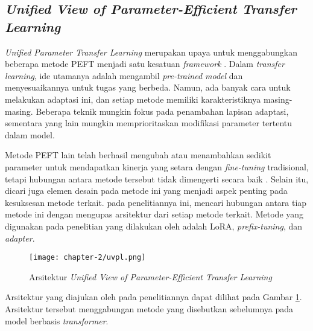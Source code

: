 \subsection{\textit{Unified View of Parameter-Efficient Transfer Learning}}

\textit{Unified Parameter Transfer Learning} merupakan upaya untuk menggabungkan beberapa metode PEFT menjadi satu kesatuan \textit{framework} \parencite{uvpl}. Dalam \textit{transfer learning}, ide utamanya adalah mengambil \textit{pre-trained model} dan menyesuaikannya untuk tugas yang berbeda. Namun, ada banyak cara untuk melakukan adaptasi ini, dan setiap metode memiliki karakteristiknya masing-masing. Beberapa teknik mungkin fokus pada penambahan lapisan adaptasi, sementara yang lain mungkin memprioritaskan modifikasi parameter tertentu dalam model.

Metode PEFT lain telah berhasil mengubah atau menambahkan sedikit parameter untuk mendapatkan kinerja yang setara dengan \textit{fine-tuning} tradisional, tetapi hubungan antara metode tersebut tidak dimengerti secara baik \parencite{uvpl}. Selain itu, dicari juga elemen desain pada metode ini yang menjadi aspek penting pada kesuksesan metode terkait. \citeauthor{uvpl} pada penelitiannya ini, mencari hubungan antara tiap metode ini dengan mengupas arsitektur dari setiap metode terkait. Metode yang digunakan pada penelitian yang dilakukan oleh \citeauthor{uvpl} adalah LoRA, \textit{prefix-tuning}, dan \textit{adapter}.

\begin{figure}[ht]
    \centering
    \texttt{[image: chapter-2/uvpl.png]}
    \caption{Arsitektur \textit{Unified View of Parameter-Efficient Transfer Learning} \parencite{uvpl}}
    \label{fig:uvpl}
\end{figure}

Arsitektur yang diajukan oleh \citeauthor{uvpl} pada penelitiannya dapat dilihat pada Gambar \ref{fig:uvpl}. Arsitektur tersebut menggabungan metode yang disebutkan sebelumnya pada model berbasis \textit{transformer}. 
